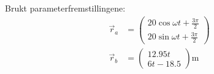\subsubsection{}

Brukt parameterfremstillingene:
\begin{align}
\vec{r}_a &= 
\begin{pmatrix} 20\cos{\omega t + \frac{3 \pi}{2}} \\ 20\sin{\omega t + \frac{3 \pi}{2}} \end{pmatrix} \\[1em]
\vec{r}_b &= 
\begin{pmatrix} 12.95 t \\ 6 t - 18.5 \end{pmatrix} \mathrm{m}
\end{align}

\begin{figure}[H]
\centering

\caption{}
\end{figure}

\newpage




\newpage